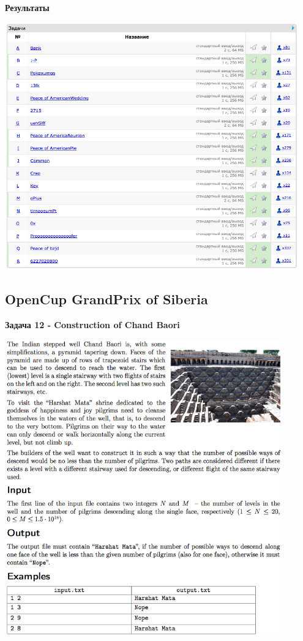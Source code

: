 \documentclass[a4paper,12pt]{article}
\begin{document}
\newpage
\textbf{{\large Результаты}} \\
\begin{center}
\includegraphics[width=0.95\textwidth]{CT_Crypto/CT_Crypto_result.png}\\ [1cm]
\end{center}



%
%
\newpage
\subsection{OpenCup GrandPrix of Siberia}

\textbf{{\large Задача 12 - Construction of Chand Baori}} \\
\begin{center}
\includegraphics[width=0.9\textwidth]{OC_Siberia/OC_Siberia_12.png}\\ [1cm]
\end{center}
\newpage
\end{document}
